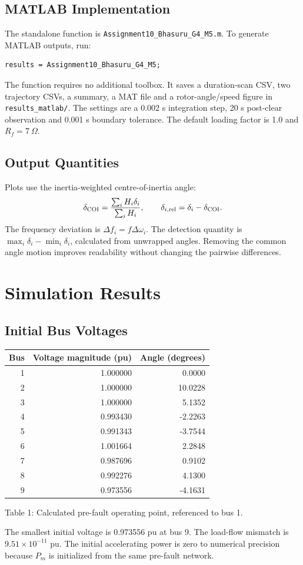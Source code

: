 \documentclass[11pt,a4paper]{article}
\newcommand{\captext}[1]{\begin{center}\small #1\end{center}}
\begin{document}
\subsection{MATLAB Implementation}
The standalone function is \texttt{Assignment10\_Bhasuru\_G4\_M5.m}. To generate MATLAB outputs, run:
\begin{verbatim}
results = Assignment10_Bhasuru_G4_M5;
\end{verbatim}
The function requires no additional toolbox. It saves a duration-scan CSV, two trajectory CSVs, a summary, a MAT file and a rotor-angle/speed figure in \texttt{results\_matlab/}. The settings are a 0.002 s integration step, 20 s post-clear observation and 0.001 s boundary tolerance. The default loading factor is 1.0 and $R_f=7\ \Omega$.
\subsection{Output Quantities}
Plots use the inertia-weighted centre-of-inertia angle:
\[\delta_{\rm COI}=\frac{\sum_iH_i\delta_i}{\sum_iH_i},\qquad
\delta_{i,\rm rel}=\delta_i-\delta_{\rm COI}.\]
The frequency deviation is $\Delta f_i=f\Delta\omega_i$. The detection quantity is $\max_i\delta_i-\min_i\delta_i$, calculated from unwrapped angles. Removing the common angle motion improves readability without changing the pairwise differences.
\newpage
\section{Simulation Results}
\subsection{Initial Bus Voltages}
\begin{center}\begin{tabular}{rrr}\toprule Bus&Voltage magnitude (pu)&Angle (degrees)\\\midrule
1 & 1.000000 & 0.0000 \\
2 & 1.000000 & 10.0228 \\
3 & 1.000000 & 5.1352 \\
4 & 0.993430 & -2.2263 \\
5 & 0.991343 & -3.7544 \\
6 & 1.001664 & 2.2848 \\
7 & 0.987696 & 0.9102 \\
8 & 0.992276 & 4.1300 \\
9 & 0.973556 & -4.1631 \\
\bottomrule\end{tabular}\end{center}
\captext{Table 1: Calculated pre-fault operating point, referenced to bus 1.}
The smallest initial voltage is 0.973556 pu at bus 9. The load-flow mismatch is $9.51\times10^{-11}$ pu. The initial accelerating power is zero to numerical precision because $P_m$ is initialized from the same pre-fault network.
\end{document}
